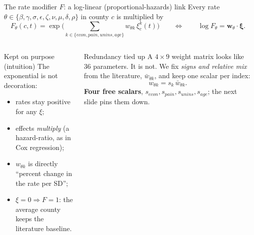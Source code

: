﻿\documentclass[9pt,aspectratio=169]{beamer}
\newenvironment{tied}{\begin{alertblock}{Redundancy tied up}\small}{\end{alertblock}}
\newenvironment{kept}{\begin{exampleblock}{Kept on purpose (intuition)}\small}{\end{exampleblock}}
\begin{document}
\begin{frame}{The rate modifier $F$: a log-linear (proportional-hazards) link}
 Every rate $\theta\in\{\beta,\gamma,\sigma,\epsilon,\zeta,\nu,\mu,\delta,\rho\}$ in county $c$ is multiplied by
 \[
  F_\theta(c,t)=\exp\Big(\sum_{k\in\{econ,pain,unins,age\}} w_{\theta k}\,\xi^k_c(t)\Big)
  \qquad\Longleftrightarrow\qquad \log F_\theta = \bm w_\theta\cdot\bm\xi .
 \]
 \begin{columns}[T]
 \begin{kept}
  The exponential is not decoration:
  \begin{itemize}\setlength\itemsep{1pt}
   \item rates stay positive for any $\xi$;
   \item effects \emph{multiply} (a hazard-ratio, as in Cox regression);
   \item $w_{\theta k}$ is directly ``percent change in the rate per SD'';
   \item $\xi=0\Rightarrow F=1$: the average county keeps the literature baseline.
  \end{itemize}
 \end{kept}
 \begin{tied}
  A $4\times 9$ weight matrix looks like 36 parameters. It is not. We fix \emph{signs and relative mix} from the literature, $\bar w_{\theta k}$, and keep one scalar per index:
  \[ w_{\theta k}=s_k\,\bar w_{\theta k}. \]
  \textbf{Four free scalars}, $s_{econ},s_{pain},s_{unins},s_{age}$; the next slide pins them down.
 \end{tied}
 \end{columns}
\end{frame}
\end{document}
